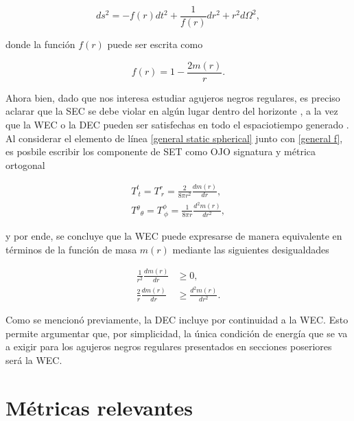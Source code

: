 \documentclass{article}
\numberwithin{equation}{section}
\theoremstyle{definition}
\begin{document}
\begin{equation}
\label{general static spherical}
ds^2 = -f(r)dt^2 + \frac{1}{f(r)}dr^2 + r^2d\Omega^2,
\end{equation}

donde la función $f(r)$ puede ser escrita como

\begin{equation}
\label{general f}
f(r) = 1 - \frac{2m(r)}{r}.
\end{equation}

Ahora bien, dado que nos interesa estudiar agujeros negros regulares, es preciso aclarar que la SEC se debe violar en algún lugar dentro del horizonte \cite{zaslavskii}, a la vez que la WEC o la DEC pueden ser satisfechas en todo el espaciotiempo generado \cite{dymnikova2004}. Al considerar el elemento de línea \eqref{general static spherical} junto con \eqref{general f}, es posbile escribir los componente de SET como \cite{vanegas-weak} OJO signatura y métrica ortogonal

\begin{equation}
\label{wec set comp}
\begin{aligned}
T^{t}_{\ t} = T^{r}_{\ r} = \frac{2}{8 \pi r^2} \frac{dm(r)}{dr},\\ T{^\theta}_{\theta} = T^{\phi}_{\ \phi} = \frac{1}{8 \pi r} \frac{d^2m(r)}{dr^2},
\end{aligned}
\end{equation}

y por ende, se concluye que la WEC puede expresarse de manera equivalente en términos de la función de masa $m(r)$ mediante las siguientes desigualdades

\begin{equation}
\label{mass wec ineq}
\begin{aligned}
\frac{1}{r^2}\frac{dm(r)}{dr} &\geq 0,\\
\frac{2}{r}\frac{dm(r)}{dr} &\geq \frac{d^2m(r)}{dr^2}.
\end{aligned}
\end{equation}

Como se mencionó previamente, la DEC incluye por continuidad a la WEC. Esto permite argumentar que, por simplicidad, la única condición de energía que se va a exigir para los agujeros negros regulares presentados en secciones poseriores será la WEC.

\section{\label{previous metrics section} Métricas relevantes}
\end{document}
